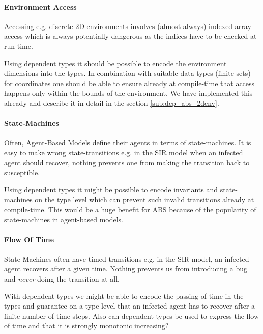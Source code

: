 

\paragraph{Environment Access}
Accessing e.g. discrete 2D environments involves (almost always) indexed array access which is always potentially dangerous as the indices have to be checked at run-time.

Using dependent types it should be possible to encode the environment dimensions into the types. In combination with suitable data types (finite sets) for coordinates one should be able to ensure already at compile-time that access happens only within the bounds of the environment. We have implemented this already and describe it in detail in the section \ref{sub:dep_abs_2denv}.

\paragraph{State-Machines}
Often, Agent-Based Models define their agents in terms of state-machines. It is easy to make wrong state-transitions e.g. in the SIR model when an infected agent should recover, nothing prevents one from making the transition back to susceptible. 

Using dependent types it might be possible to encode invariants and state-machines on the type level which can prevent such invalid transitions already at compile-time. This would be a huge benefit for ABS because of the popularity of state-machines in agent-based models.

\paragraph{Flow Of Time}
State-Machines often have timed transitions e.g. in the SIR model, an infected agent recovers after a given time. Nothing prevents us from introducing a bug and \textit{never} doing the transition at all.

With dependent types we might be able to encode the passing of time in the types and guarantee on a type level that an infected agent has to recover after a finite number of time steps. Also can dependent types be used to express the flow of time and that it is strongly monotonic increasing?
	

